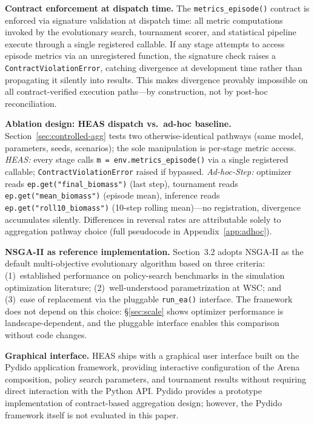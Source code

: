 \documentclass{wscpaperproc}
\begin{document}
\textbf{Contract enforcement at dispatch time.} The \texttt{metrics\_episode()}
contract is enforced via signature validation at dispatch time: all metric
computations invoked by the evolutionary search, tournament scorer, and
statistical pipeline execute through a single registered callable. If any stage
attempts to access episode metrics via an unregistered function, the signature
check raises a \texttt{ContractViolationError}, catching divergence at development
time rather than propagating it silently into results. This makes divergence
provably impossible on all contract-verified execution paths---by construction,
not by post-hoc reconciliation.

\textbf{Ablation design: HEAS dispatch vs.\ ad-hoc baseline.}
\label{sec:ablation-design}
Section~\ref{sec:controlled-agg} tests two otherwise-identical pathways
(same model, parameters, seeds, scenarios); the sole manipulation is per-stage
metric access. \emph{HEAS:} every stage calls
\texttt{m = env.metrics\_episode()} via a single registered callable;
\texttt{ContractViolationError} raised if bypassed. \emph{Ad-hoc-Step:}
optimizer reads \texttt{ep.get("final\_biomass")} (last step), tournament reads
\texttt{ep.get("mean\_biomass")} (episode mean), inference reads
\texttt{ep.get("roll10\_biomass")} (10-step rolling mean)---no registration,
divergence accumulates silently. Differences in reversal rates are attributable
solely to aggregation pathway choice (full pseudocode in Appendix~\ref{app:adhoc}).

\textbf{NSGA-II as reference implementation.} Section~3.2 adopts NSGA-II as the
default multi-objective evolutionary algorithm based on three criteria:
(1)~established performance on policy-search benchmarks in the simulation
optimization literature; (2)~well-understood parametrization at WSC; and
(3)~ease of replacement via the pluggable \texttt{run\_ea()} interface. The
framework does not depend on this choice: \S\ref{sec:scale} shows optimizer performance is landscape-dependent, and the pluggable interface enables this comparison without code changes.

\textbf{Graphical interface.} HEAS ships with a graphical user interface
built on the Pydido application framework, providing interactive configuration
of the Arena composition, policy search parameters, and tournament results
without requiring direct interaction with the Python API.
Pydido provides a prototype implementation of contract-based aggregation design;
however, the Pydido framework itself is not evaluated in this paper.
\end{document}
